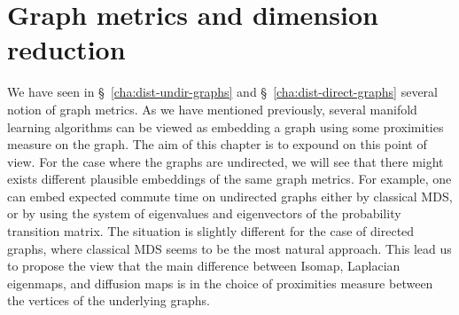 \chapter{Graph metrics and dimension reduction}
\label{cha:graph-metr-dimens}
We have seen in \S~\ref{cha:dist-undir-graphs} and
\S~\ref{cha:dist-direct-graphs} several notion of graph metrics. As we
have mentioned previously, several manifold learning algorithms can be
viewed as embedding a graph using some proximities measure on the
graph. The aim of this chapter is to expound on this point of
view. For the case where the graphs are undirected, we will see that
there might exists different plausible embeddings of the same graph
metrics. For example, one can embed expected commute time on
undirected graphs either by classical MDS, or by using the system of
eigenvalues and eigenvectors of the probability transition matrix.
The situation is slightly different for the case of directed graphs,
where classical MDS seems to be the most natural approach.  This lead
us to propose the view that the main difference between Isomap,
Laplacian eigenmaps, and diffusion maps is in the choice of
proximities measure between the vertices of the underlying graphs.

